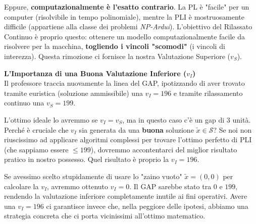 \documentclass[12pt, a4paper]{article}
\newcommand{\separatore}{\noindent{\color{titlecolor!50}\rule{\textwidth}{0.6pt}}}
\begin{document}
	Eppure, \textbf{computazionalmente è l'esatto contrario}. La PL è "facile" per un computer (risolvibile in tempo polinomiale), mentre la PLI è mostruosamente difficile (appartiene alla classe dei problemi \textit{NP-Ardui}). L'obiettivo del Rilassato Continuo è proprio questo: ottenere un modello computazionalmente facile da risolvere per la macchina, \textbf{togliendo i vincoli "scomodi"} (i vincoli di interezza). Questa rimozione ci fornisce la nostra Valutazione Superiore ($v_S$).
	
	\vspace{0.4cm}
	\textbf{L'Importanza di una Buona Valutazione Inferiore ($v_I$)}\\
	Il professore traccia nuovamente la linea del GAP, ipotizzando di aver trovato tramite euristica (soluzione ammissibile) una $v_I = 196$ e tramite rilassamento continuo una $v_S = 199$.
	
	\begin{figure}[H]
		\centering
	\end{figure}
	
	L'ottimo ideale lo avremmo se $v_I = v_S$, ma in questo caso c'è un gap di 3 unità. Perché è cruciale che $v_I$ sia generata da una \textbf{buona} soluzione $\tilde{x} \in \mathcal{S}$? 
	Se noi non riuscissimo ad applicare algoritmi complessi per trovare l'ottimo perfetto di PLI (che sappiamo essere $\leq 199$), dovremmo accontentarci del miglior risultato pratico in nostro possesso. Quel risultato è proprio la $v_I = 196$. 
	
	Se avessimo scelto stupidamente di usare lo "zaino vuoto" $\tilde{x} = (0,0)$ per calcolare la $v_I$, avremmo ottenuto $v_I = 0$. Il GAP sarebbe stato tra $0$ e $199$, rendendo la valutazione inferiore completamente inutile ai fini operativi. Avere una $v_I = 196$ ci garantisce invece che, nella peggiore delle ipotesi, abbiamo una strategia concreta che ci porta vicinissimi all'ottimo matematico.
	
	\vspace{0.6cm}
	\separatore
	\vspace{0.4cm}
	
\end{document}
